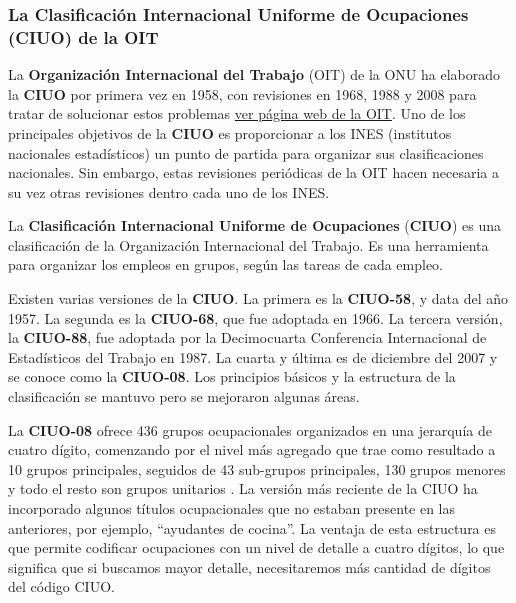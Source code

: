 \documentclass[
]{book}
\begin{document}
\hypertarget{la-clasificaciuxf3n-internacional-uniforme-de-ocupaciones-ciuo-de-la-oit}{%
\subsubsection{La Clasificación Internacional Uniforme de Ocupaciones (CIUO) de la OIT}\label{la-clasificaciuxf3n-internacional-uniforme-de-ocupaciones-ciuo-de-la-oit}}

La \textbf{Organización Internacional del Trabajo} (OIT) de la ONU ha elaborado la \textbf{CIUO} por primera vez en 1958, con revisiones en 1968, 1988 y 2008 para tratar de solucionar estos problemas \href{https://www.ilo.org/public/spanish/bureau/stat/isco/}{ver página web de la OIT}. Uno de los principales objetivos de la \textbf{CIUO} es proporcionar a los INES (institutos nacionales estadísticos) un punto de partida para organizar sus clasificaciones nacionales. Sin embargo, estas revisiones periódicas de la OIT hacen necesaria a su vez otras revisiones dentro cada uno de los INES.

La \textbf{Clasificación Internacional Uniforme de Ocupaciones} (\textbf{CIUO}) es una clasificación de la Organización Internacional del Trabajo. Es una herramienta para organizar los empleos en grupos, según las tareas de cada empleo.

Existen varias versiones de la \textbf{CIUO}. La primera es la \textbf{CIUO-58}, y data del año 1957. La segunda es la \textbf{CIUO-68}, que fue adoptada en 1966. La tercera versión, la \textbf{CIUO-88}, fue adoptada por la Decimocuarta Conferencia Internacional de Estadísticos del Trabajo en 1987. La cuarta y última es de diciembre del 2007 y se conoce como la \textbf{CIUO-08}. Los principios básicos y la estructura de la clasificación se mantuvo pero se mejoraron algunas áreas.

La \textbf{CIUO-08} ofrece 436 grupos ocupacionales organizados en una jerarquía de cuatro dígito, comenzando por el nivel más agregado que trae como resultado a 10 grupos principales, seguidos de 43 sub-grupos principales, 130 grupos menores y todo el resto son grupos unitarios \citep[2012]{OIT}. La versión más reciente de la CIUO ha incorporado algunos títulos ocupacionales que no estaban presente en las anteriores, por ejemplo, ``ayudantes de cocina''. La ventaja de esta estructura es que permite codificar ocupaciones con un nivel de detalle a cuatro dígitos, lo que significa que si buscamos mayor detalle, necesitaremos más cantidad de dígitos del código CIUO.
\end{document}
